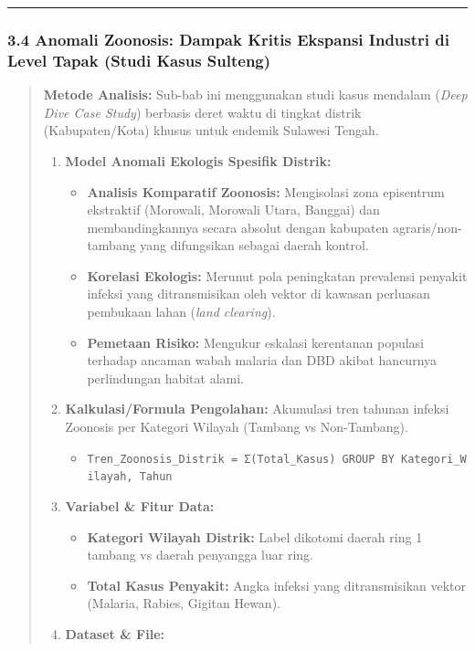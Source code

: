 \documentclass[
]{article}
\providecommand{\tightlist}{%
  \setlength{\itemsep}{0pt}\setlength{\parskip}{0pt}}
\begin{document}
\begin{center}\rule{0.5\linewidth}{0.5pt}\end{center}

\subsubsection{3.4 Anomali Zoonosis: Dampak Kritis Ekspansi Industri di
Level Tapak (Studi Kasus
Sulteng)}\label{anomali-zoonosis-dampak-kritis-ekspansi-industri-di-level-tapak-studi-kasus-sulteng}

\begin{quote}
\textbf{Metode Analisis:} Sub-bab ini menggunakan studi kasus mendalam
(\emph{Deep Dive Case Study}) berbasis deret waktu di tingkat distrik
(Kabupaten/Kota) khusus untuk endemik Sulawesi Tengah.

\begin{enumerate}
\def\labelenumi{\arabic{enumi}.}
\tightlist
\item
  \textbf{Model Anomali Ekologis Spesifik Distrik:}

  \begin{itemize}
  \tightlist
  \item
    \textbf{Analisis Komparatif Zoonosis:} Mengisolasi zona episentrum
    ekstraktif (Morowali, Morowali Utara, Banggai) dan membandingkannya
    secara absolut dengan kabupaten agraris/non-tambang yang difungsikan
    sebagai daerah kontrol.
  \item
    \textbf{Korelasi Ekologis:} Merunut pola peningkatan prevalensi
    penyakit infeksi yang ditransmisikan oleh vektor di kawasan
    perluasan pembukaan lahan (\emph{land clearing}).
  \item
    \textbf{Pemetaan Risiko:} Mengukur eskalasi kerentanan populasi
    terhadap ancaman wabah malaria dan DBD akibat hancurnya perlindungan
    habitat alami.
  \end{itemize}
\item
  \textbf{Kalkulasi/Formula Pengolahan:} Akumulasi tren tahunan infeksi
  Zoonosis per Kategori Wilayah (Tambang vs Non-Tambang).

  \begin{itemize}
  \tightlist
  \item
    \texttt{Tren\_Zoonosis\_Distrik\ =\ Σ(Total\_Kasus)\ GROUP\ BY\ Kategori\_Wilayah,\ Tahun}
  \end{itemize}
\item
  \textbf{Variabel \& Fitur Data:}

  \begin{itemize}
  \tightlist
  \item
    \textbf{Kategori Wilayah Distrik:} Label dikotomi daerah ring 1
    tambang vs daerah penyangga luar ring.
  \item
    \textbf{Total Kasus Penyakit:} Angka infeksi yang ditransmisikan
    vektor (Malaria, Rabies, Gigitan Hewan).
  \end{itemize}
\item
  \textbf{Dataset \& File:}


\end{enumerate}
\end{quote}
\end{document}
